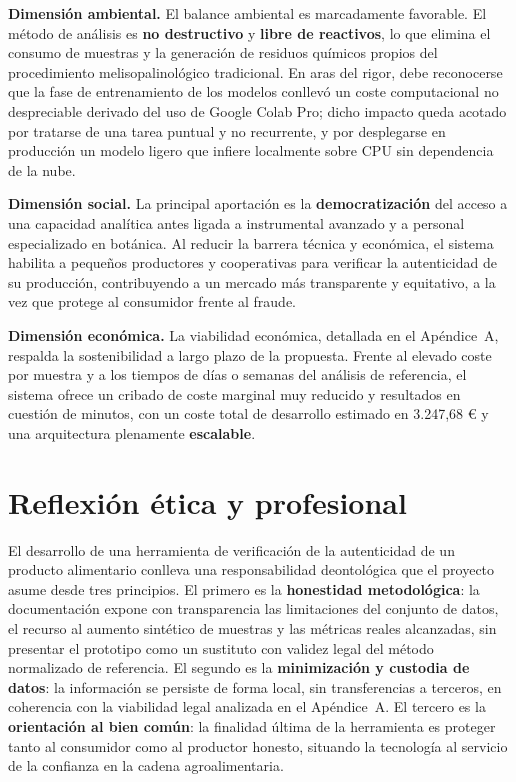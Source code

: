 \textbf{Dimensión ambiental.}
El balance ambiental es marcadamente favorable. El método de análisis es
\textbf{no destructivo} y \textbf{libre de reactivos}, lo que elimina el consumo
de muestras y la generación de residuos químicos propios del procedimiento
melisopalinológico tradicional. En aras del rigor, debe reconocerse que la fase
de entrenamiento de los modelos conllevó un coste computacional no despreciable
derivado del uso de Google Colab Pro; dicho impacto queda acotado por
tratarse de una tarea puntual y no recurrente, y por desplegarse en producción un
modelo ligero que infiere localmente sobre CPU sin dependencia de la nube.
 
\textbf{Dimensión social.}
La principal aportación es la \textbf{democratización} del acceso a una capacidad
analítica antes ligada a instrumental avanzado y a personal especializado en
botánica. Al reducir la barrera técnica y económica, el sistema habilita a
pequeños productores y cooperativas para verificar la autenticidad de su
producción, contribuyendo a un mercado más transparente y equitativo, a la vez
que protege al consumidor frente al fraude.
 
\textbf{Dimensión económica.}
La viabilidad económica, detallada en el Apéndice~A, respalda la sostenibilidad a
largo plazo de la propuesta. Frente al elevado coste por muestra y a los tiempos
de días o semanas del análisis de referencia, el sistema ofrece un cribado de
coste marginal muy reducido y resultados en cuestión de minutos, con un coste
total de desarrollo estimado en 3.247,68 € y una arquitectura plenamente
\textbf{escalable}.
 
\section{Reflexión ética y profesional}
 
El desarrollo de una herramienta de verificación de la autenticidad de un
producto alimentario conlleva una responsabilidad deontológica que el proyecto
asume desde tres principios. El primero es la \textbf{honestidad metodológica}:
la documentación expone con transparencia las limitaciones del conjunto de datos,
el recurso al aumento sintético de muestras y las métricas reales alcanzadas, sin
presentar el prototipo como un sustituto con validez legal del método normalizado
de referencia. El segundo es la \textbf{minimización y custodia de datos}: la
información se persiste de forma local, sin transferencias a terceros, en
coherencia con la viabilidad legal analizada en el Apéndice~A. El tercero es la
\textbf{orientación al bien común}: la finalidad última de la herramienta es
proteger tanto al consumidor como al productor honesto, situando la tecnología al
servicio de la confianza en la cadena agroalimentaria.
 
